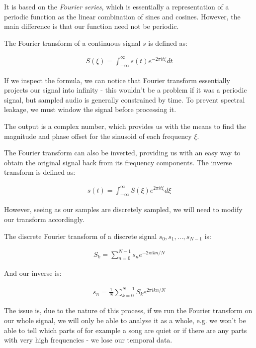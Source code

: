 It is based on the \emph{Fourier series}, which is essentially a representation of a periodic function as the linear combination of sines and cosines. \cite{Shatkay:1995:FTP:864947} However, the main difference is that our function need not be periodic.

The Fourier transform of a continuous signal $s$ is defined as: \cite{Recoskie2014ConstrainedNM}

\begin{align}
S(\xi) = \int_{-\infty}^{\infty}s(t)e^{-2\pi it\xi}dt
\end{align}

If we inspect the formula, we can notice that Fourier transform essentially projects our signal into infinity - this wouldn't be a problem if it was a periodic signal, but sampled audio is generally constrained by time. To prevent spectral leakage, we must window the signal before processing it.

The output is a complex number, which provides us with the means to find the magnitude and phase offset for the sinusoid of each frequency $\xi$.

The Fourier transform can also be inverted, providing us with an easy way to obtain the original signal back from its frequency components. The inverse transform is defined as:

\begin{align}
s(t) = \int_{-\infty}^{\infty}S(\xi)e^{2\pi it\xi}d\xi
\end{align}

However, seeing as our samples are discretely sampled, we will need to modify our transform accordingly.

The discrete Fourier transform of a discrete signal $s_0, s_1, ..., s_{N-1}$ is: \cite{Recoskie2014ConstrainedNM}

\begin{align}
S_k = \sum_{n=0}^{N-1}s_ne^{-2\pi ikn/N}
\end{align}

And our inverse is:

\begin{align}
s_n = \frac1N \sum_{k=0}^{N-1}S_ke^{2\pi ikn/N}
\end{align}

The issue is, due to the nature of this process, if we run the Fourier transform on our whole signal, we will only be able to analyse it as a whole, e.g. we won't be able to tell which parts of for example a song are quiet or if there are any parts with very high frequencies - we lose our temporal data.

